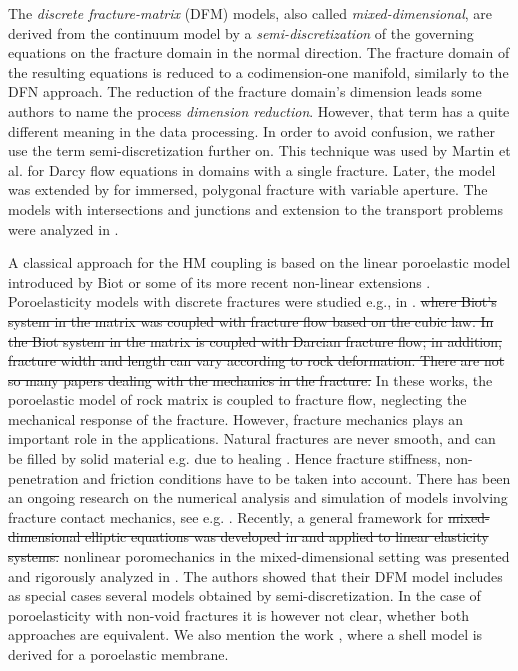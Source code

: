 \documentclass[a4paper]{article}
\numberwithin{equation}{section}
\def\js#1{{\color{blue}#1}}
\begin{document}
The \textit{discrete fracture-matrix} (DFM) models, also called \textit{mixed-dimensional}, are derived from the continuum model by a \textit{semi-discretization} of the governing equations on the fracture domain
in the normal direction. The fracture domain of the resulting equations is reduced to a codimension-one manifold, similarly to the DFN approach. The reduction of the fracture domain's dimension leads some authors to name the process \textit{dimension reduction}. However, that term has a quite different meaning in the data processing. In order to avoid confusion, we rather use the term semi-discretization further on.
% 
This technique was used by Martin et al. \cite{martin_modeling_2005} for Darcy flow equations in domains with a single fracture.
Later, the model was extended by \cite{angot2009asymptotic} for immersed, polygonal fracture with variable aperture. The models with intersections and junctions and extension to the transport problems were analyzed in \cite{maryska2005numerical,pichot2012generalized,formaggia2014reduced, schwenck2015dimensionally,hokr2016real}.

A classical approach for the HM coupling is based on the linear poroelastic model introduced by Biot \cite{biot1941general} or some of its more recent non-linear extensions \cite{rutqvist2003role,Jing2007Fluid}. 
Poroelasticity models with discrete fractures were studied e.g., in \cite{ganis2014modeling,girault_lubrication,girault2019mixed,bukac2017dimensional,hanowski2018hydromechanical}.
\js{\sout{ where Biot's system in the matrix was coupled with fracture flow based on the cubic law.
In %
the Biot system in the matrix is coupled with Darcian fracture flow; in addition, fracture width and length can vary according to rock deformation.
There are not so many papers dealing with the mechanics in the fracture.}
In these works, the poroelastic model of rock matrix is coupled to fracture flow, neglecting the mechanical response of the fracture.
However, fracture mechanics plays an important role in the applications. Natural fractures are never smooth, and can be filled by solid material e.g. due to healing \cite{vass}. Hence fracture stiffness, non-penetration and friction conditions have to be taken into account.
There has been an ongoing research on the numerical analysis and simulation of models involving fracture contact mechanics, see e.g. \cite{garipov2016discrete,franceschini2020algebraically,berge2019finite,blaheta2020bayesian,bonaldi2022numerical}.}
\js{Recently,} a general framework for \js{\sout{mixed-dimensional elliptic equations was developed in
and applied to linear elasticity systems.}
nonlinear poromechanics in the mixed-dimensional setting was presented and rigorously analyzed in \cite{boon_poro}.
The authors showed that their DFM model includes as special cases several models obtained by semi-discretization.
In the case of poroelasticity with non-void fractures it is however not clear, whether both approaches are equivalent.}
We also mention the work \cite{mikelic2019derivation}, where a shell model is derived for a poroelastic membrane.
\end{document}

